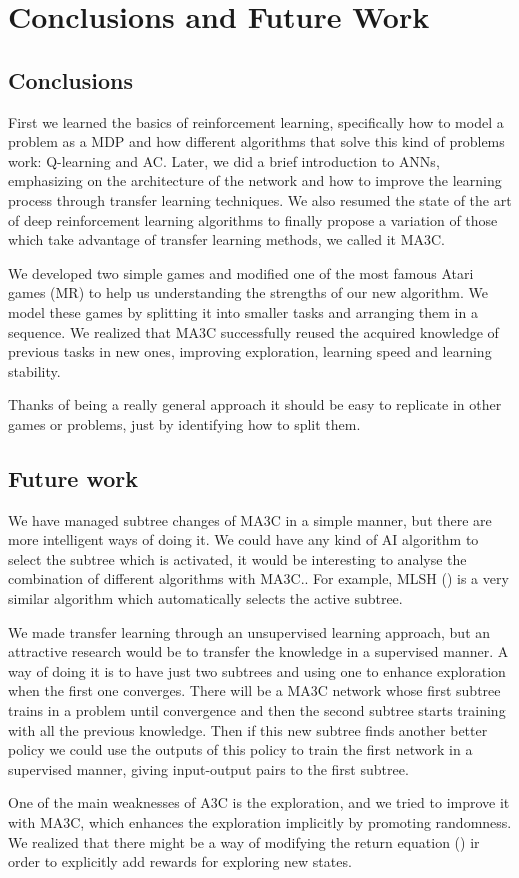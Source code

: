 \chapter{Conclusions and Future Work}
\section{Conclusions}
First we learned the basics of reinforcement learning, specifically how to model a problem as a \acl{MDP} and how different
algorithms that solve this kind of problems work: Q-learning and \acl{AC}.
Later, we did a brief introduction to \aclp{ANN}, emphasizing on the architecture of the network and how to improve
the learning process through transfer learning techniques.
We also resumed the state of the art of deep reinforcement learning algorithms to finally propose a variation of those
which take advantage of transfer learning methods, we called it \acl{MA3C}.

We developed two simple games and modified one of the most famous Atari games (\acl{MR}) to help us understanding the
strengths of our new algorithm.
We model these games by splitting it into smaller tasks and arranging them in a sequence.
We realized that \ac{MA3C} successfully reused the acquired knowledge of previous tasks in new ones, improving exploration,
learning speed and learning stability.

Thanks of being a really general approach it should be easy to replicate in other games or problems, just by identifying
how to split them.

\section{Future work}

We have managed subtree changes of \ac{MA3C} in a simple manner, but there are more intelligent ways of doing it.
We could have any kind of \ac{AI} algorithm to select the subtree which is activated, it would be interesting to analyse
the combination of different algorithms with \ac{MA3C}..
For example, MLSH (\cite{frans2017meta}) is a very similar algorithm which automatically selects the active subtree.

We made transfer learning through an unsupervised learning approach, but an attractive research would be to transfer the
knowledge in a supervised manner.
A way of doing it is to have just two subtrees and using one to enhance exploration when the first one converges.
There will be a \ac{MA3C} network whose first subtree trains in a problem until convergence and then the second subtree
starts training with all the previous knowledge.
Then if this new subtree finds another better policy we could use the outputs of this policy to train the first network
in a supervised manner, giving input-output pairs to the first subtree.

One of the main weaknesses of \ac{A3C} is the exploration, and we tried to improve it with \ac{MA3C}, which enhances the
exploration implicitly by promoting randomness.
We realized that there might be a way of modifying the return equation () ir order to explicitly add
rewards for exploring new states.

